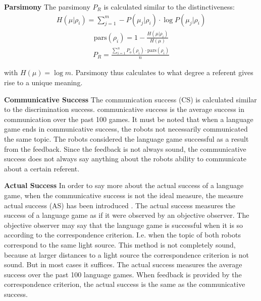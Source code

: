 \begin{description}
\item {\bf Parsimony} The parsimony $P_R$ is calculated similar to the distinctiveness:
\begin{eqnarray}
H(\mu|\rho_i)=\sum_{j=1}^m -P(\mu_j|\rho_i) \cdot \log P(\mu_j|\rho_i)
\end{eqnarray}
\begin{eqnarray}
\mbox{pars}(\rho_i)=1-\frac{H(\mu|\rho_i)}{H(\mu)}
\end{eqnarray}
\begin{eqnarray}
P_R=\frac{\sum_{i=1}^n P_o(\rho_i) \cdot \mbox{pars}(\rho_i)}{n}
\end{eqnarray}


with $H(\mu)= \log m$. Parsimony thus calculates to what degree a referent gives rise to a unique meaning.

\item {\bf Communicative Success} The communication success
(CS) is calculated similar to the discrimination success. communicative success is the average success in communication
over the past 100 games. It must be noted that when a language
game ends in communicative success, the robots not necessarily
communicated the same topic. The robots considered the language
game successful as a result from the feedback. Since the feedback is not always sound, the communicative success does not always say anything about
the robots ability to communicate about a certain referent.

\item {\bf Actual Success} In order to say more about the
actual success of a language game, when the communicative success is not the ideal measure, the measure actual success (AS) has been introduced \citep{vogt:1998b}. The actual success
measures the success of a language game as if it were observed
by an objective observer. The objective observer may say that the language game is successful when it is so according to the correspondence criterion. I.e. when the topic of both robots correspond to the same light source. This method is not completely sound, because at larger distances to a light source the correspondence criterion is not sound. But in most cases it suffices. The actual success measures the
average success over the past 100 language games. When feedback is provided by the correspondence criterion, the actual success is the same as the communicative success.


\end{description}
